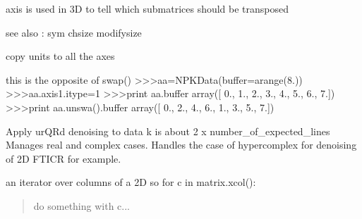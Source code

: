 \documentclass[letterpaper,10pt,openany,oneside]{sphinxmanual}
\begin{document}
\begin{fulllineitems}
\begin{fulllineitems}
axis is used in 3D to tell which submatrices should be transposed

see also : sym chsize modifysize

\end{fulllineitems}


\begin{fulllineitems}
\label{rst/code:NPKData.NPKData.units}
copy units to all the axes

\end{fulllineitems}


\begin{fulllineitems}
\label{rst/code:NPKData.NPKData.unswap}
this is the opposite of swap()
\textgreater{}\textgreater{}\textgreater{}aa=NPKData(buffer=arange(8.))
\textgreater{}\textgreater{}\textgreater{}aa.axis1.itype=1
\textgreater{}\textgreater{}\textgreater{}print aa.buffer
array({[} 0.,  1.,  2.,  3.,  4.,  5.,  6.,  7.{]})
\textgreater{}\textgreater{}\textgreater{}print aa.unswa().buffer
array({[} 0.,  2.,  4.,  6.,  1.,  3.,  5.,  7.{]})

\end{fulllineitems}


\begin{fulllineitems}
\label{rst/code:NPKData.NPKData.urqrd}
Apply urQRd denoising to data
k is about 2 x number\_of\_expected\_lines
Manages real and complex cases.
Handles the case of hypercomplex for denoising of 2D FTICR for example.

\end{fulllineitems}


\begin{fulllineitems}
\label{rst/code:NPKData.NPKData.xcol}
an iterator over columns of a 2D
so 
for c in matrix.xcol():
\begin{quote}

do something with c...
\end{quote}


\end{fulllineitems}
\end{fulllineitems}
\end{document}

